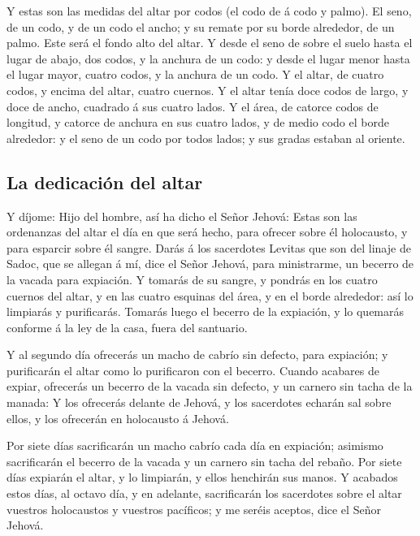  Y estas son las medidas del altar por codos (el codo de
á codo y palmo). El seno, de un codo, y de un codo el ancho; y su remate
por su borde alrededor, de un palmo. Este será el fondo alto del altar.
 Y desde el seno de sobre el suelo hasta el lugar de
abajo, dos codos, y la anchura de un codo: y desde el lugar menor hasta
el lugar mayor, cuatro codos, y la anchura de un codo.  Y
el altar, de cuatro codos, y encima del altar, cuatro cuernos.
 Y el altar tenía doce codos de largo, y doce de ancho,
cuadrado á sus cuatro lados.  Y el área, de catorce codos
de longitud, y catorce de anchura en sus cuatro lados, y de medio codo
el borde alrededor: y el seno de un codo por todos lados; y sus gradas
estaban al oriente.

\hypertarget{la-dedicaciuxf3n-del-altar}{%
\subsection{La dedicación del altar}\label{la-dedicaciuxf3n-del-altar}}

 Y díjome: Hijo del hombre, así ha dicho el Señor Jehová:
Estas son las ordenanzas del altar el día en que será hecho, para
ofrecer sobre él holocausto, y para esparcir sobre él sangre.
 Darás á los sacerdotes Levitas que son del linaje de
Sadoc, que se allegan á mí, dice el Señor Jehová, para ministrarme, un
becerro de la vacada para expiación.  Y tomarás de su
sangre, y pondrás en los cuatro cuernos del altar, y en las cuatro
esquinas del área, y en el borde alrededor: así lo limpiarás y
purificarás.  Tomarás luego el becerro de la expiación, y
lo quemarás conforme á la ley de la casa, fuera del santuario.

 Y al segundo día ofrecerás un macho de cabrío sin
defecto, para expiación; y purificarán el altar como lo purificaron con
el becerro.  Cuando acabares de expiar, ofrecerás un
becerro de la vacada sin defecto, y un carnero sin tacha de la manada:
 Y los ofrecerás delante de Jehová, y los sacerdotes
echarán sal sobre ellos, y los ofrecerán en holocausto á Jehová.

 Por siete días sacrificarán un macho cabrío cada día en
expiación; asimismo sacrificarán el becerro de la vacada y un carnero
sin tacha del rebaño.  Por siete días expiarán el altar,
y lo limpiarán, y ellos henchirán sus manos.  Y acabados
estos días, al octavo día, y en adelante, sacrificarán los sacerdotes
sobre el altar vuestros holocaustos y vuestros pacíficos; y me seréis
aceptos, dice el Señor Jehová.

